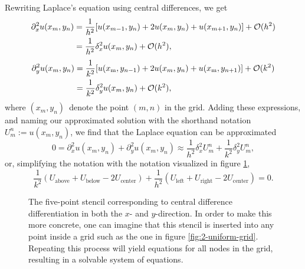 Rewriting Laplace's equation using central differences, we get
\begin{equation*}
    \begin{split}
    \partial^2_x u(x_m, y_n) 
        &= \frac{1}{h^2}[u(x_{m-1},y_n) + 2u(x_m,y_n) + u(x_{m+1},y_n)] + \mathcal{O}(h^2)\\
        &= \frac{1}{h^2}\delta^2_x u(x_m,y_n) + \mathcal{O}(h^2),\\
    \end{split}
\end{equation*}
\begin{equation*}
    \begin{split}
    \partial^2_y u(x_m, y_n) 
        &= \frac{1}{k^2}[u(x_\text{m},y_{n-1}) + 2u(x_m,y_n) + u(x_\text{m},y_{n+1})] + \mathcal{O}(k^2)\\
        &= \frac{1}{k^2}\delta^2_y u(x_m,y_n) + \mathcal{O}(k^2),\\
    \end{split}
\end{equation*}
where $(x_m, y_n)$ denote the point $(m,n)$ in the grid. 
Adding these expressions, and naming our approximated solution with the shorthand notation $U_m^n := u(x_m,y_n)$, we find that the Laplace equation can be approximated 
\begin{equation*}
    0 = \partial^2_x u(x_m,y_n) + \partial^2_y u(x_m,y_n)
    \approx \frac{1}{h^2}\delta^2_x U_m^n + \frac{1}{k^2}\delta^2_y U_m^n,
\end{equation*}
or, simplifying the notation with the notation visualized in figure \ref{ex3:fig:stencil},
\begin{equation*}
    \frac{1}{k^2}(U_\text{above} + U_\text{below} - 2U_\text{center}) + \frac{1}{h^2}(U_\text{left} + U_\text{right} - 2U_\text{center}) = 0.
\end{equation*}

\begin{figure}[htb]
    \centering
    
    \caption{The five-point stencil corresponding to central difference differentiation in both the $x$- and $y$-direction. In order to make this more concrete, one can imagine that this stencil is inserted into any point inside a grid such as the one in figure \ref{fig:2-uniform-grid}. Repeating this process will yield equations for all nodes in the grid, resulting in a solvable system of equations.}
    \label{ex3:fig:stencil}
\end{figure}

